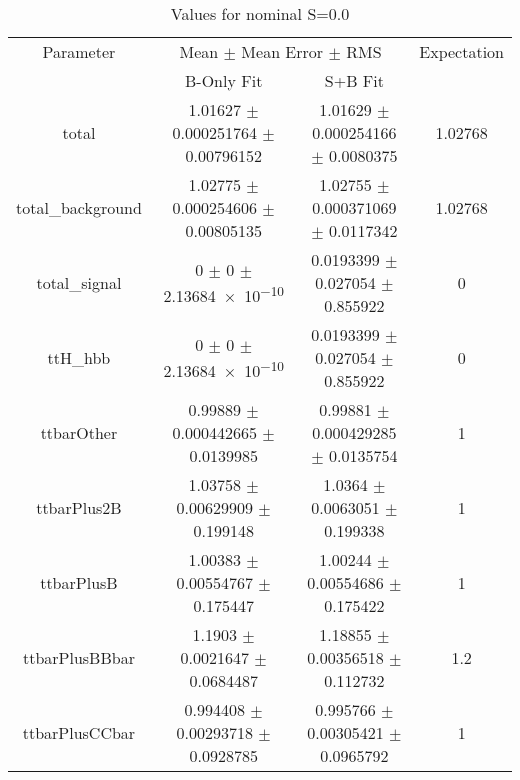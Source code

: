 \begin{table}
\centering
\caption{Values for nominal S=0.0}
\begin{tabular}{cccc}
\toprule
Parameter & \multicolumn{2}{c}{Mean $\pm$ Mean Error $\pm$ RMS} & Expectation\\
 & B-Only Fit & S+B Fit & \\
\midrule
total & \num{1.01627} $\pm$ \num{0.000251764} $\pm$ \num{0.00796152} & \num{1.01629} $\pm$ \num{0.000254166} $\pm$ \num{0.0080375} & \num{1.02768}\\
total\_background & \num{1.02775} $\pm$ \num{0.000254606} $\pm$ \num{0.00805135} & \num{1.02755} $\pm$ \num{0.000371069} $\pm$ \num{0.0117342} & \num{1.02768}\\
total\_signal & \num{0} $\pm$ \num{0} $\pm$ \num{2.13684e-10} & \num{0.0193399} $\pm$ \num{0.027054} $\pm$ \num{0.855922} & \num{0}\\
ttH\_hbb & \num{0} $\pm$ \num{0} $\pm$ \num{2.13684e-10} & \num{0.0193399} $\pm$ \num{0.027054} $\pm$ \num{0.855922} & \num{0}\\
ttbarOther & \num{0.99889} $\pm$ \num{0.000442665} $\pm$ \num{0.0139985} & \num{0.99881} $\pm$ \num{0.000429285} $\pm$ \num{0.0135754} & \num{1}\\
ttbarPlus2B & \num{1.03758} $\pm$ \num{0.00629909} $\pm$ \num{0.199148} & \num{1.0364} $\pm$ \num{0.0063051} $\pm$ \num{0.199338} & \num{1}\\
ttbarPlusB & \num{1.00383} $\pm$ \num{0.00554767} $\pm$ \num{0.175447} & \num{1.00244} $\pm$ \num{0.00554686} $\pm$ \num{0.175422} & \num{1}\\
ttbarPlusBBbar & \num{1.1903} $\pm$ \num{0.0021647} $\pm$ \num{0.0684487} & \num{1.18855} $\pm$ \num{0.00356518} $\pm$ \num{0.112732} & \num{1.2}\\
ttbarPlusCCbar & \num{0.994408} $\pm$ \num{0.00293718} $\pm$ \num{0.0928785} & \num{0.995766} $\pm$ \num{0.00305421} $\pm$ \num{0.0965792} & \num{1}\\
\bottomrule
\end{tabular}
\end{table}